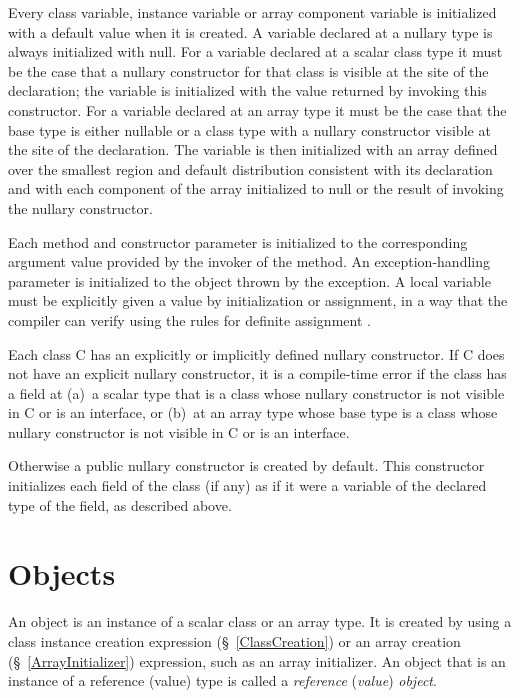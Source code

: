 Every class variable, instance variable or array component variable is
initialized with a default value when it is created.  A variable
declared at a nullary type is always initialized with {\cf null}. For
a variable declared at a scalar class type it must be the case that a
nullary constructor for that class is visible at the site of the
declaration; the variable is initialized with the value returned by
invoking this constructor. For a variable declared at an array type it
must be the case that the base type is either nullable or a class type
with a nullary constructor visible at the site of the declaration. The
variable is then initialized with an array defined over the smallest
region and default distribution consistent with its declaration and
with each component of the array initialized to {\cf null} or the
result of invoking the nullary constructor.

Each method and constructor parameter is initialized to the
corresponding argument value provided by the invoker of the method. An
exception-handling parameter is initialized to the object thrown by
the exception. A local variable must be explicitly given a value by
initialization or assignment, in a way that the compiler can verify
using the rules for definite assignment \cite[\S~16]{jls2}.

Each class {\cf C} has an explicitly or implicitly defined nullary
constructor. If {\cf C} does not have an explicit nullary
constructor, it is a compile-time error if the class has a field at (a)~a
scalar type that is a {\cf class} whose nullary constructor is not
visible in {\cf C} or is an {\cf interface}, or (b)~at an array type whose
base type is a {\cf class} whose nullary constructor is not visible in
{\cf C} or is an {\cf interface}.

Otherwise a {\cf public} nullary constructor is created by
default. This constructor initializes each field of the class (if any)
as if it were a variable of the declared type of the field, as
described above.

\section{Objects}\label{XtenObjects}

An object is an instance of a scalar class or an array type.  It is
created by using a class instance creation expression
(\S~\ref{ClassCreation}) or an array creation
(\S~\ref{ArrayInitializer}) expression, such as an array
initializer. An object that is an instance of a reference (value) type
is called a {\em reference} ({\em value}) {\em object}.

